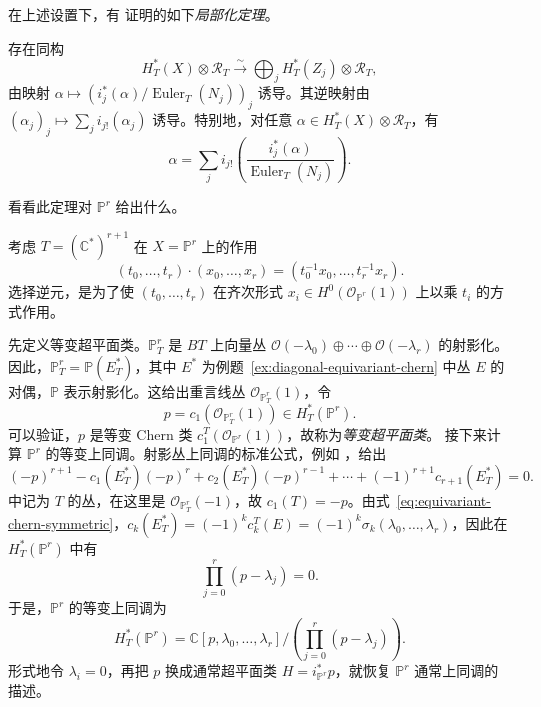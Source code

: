 在上述设置下，有  证明的如下\emph{局部化定理}。
\begin{proposition}\label{prop:atiyah-bott-localization}
存在同构
\[
H_T^*(X)\otimes\mathcal R_T\xrightarrow{\sim}\bigoplus_jH_T^*(Z_j)\otimes\mathcal R_T,
\]
由映射 $\alpha\mapsto(i_j^*(\alpha)/\operatorname{Euler}_T(N_j))_j$ 诱导。其逆映射由 $(\alpha_j)_j\mapsto\sum_ji_{j!}(\alpha_j)$ 诱导。特别地，对任意 $\alpha\in H_T^*(X)\otimes\mathcal R_T$，有
\[
\alpha=\sum_ji_{j!}\left(\frac{i_j^*(\alpha)}{\operatorname{Euler}_T(N_j)}\right).
\]
\end{proposition}
看看此定理对 $\mathbb P^r$ 给出什么。
\begin{example}\label{ex:projective-equivariant-localization}
考虑 $T=(\mathbb C^*)^{r+1}$ 在 $X=\mathbb P^r$ 上的作用
\[
(t_0,\ldots,t_r)\cdot(x_0,\ldots,x_r)=(t_0^{-1}x_0,\ldots,t_r^{-1}x_r).
\]
选择逆元，是为了使 $(t_0,\ldots,t_r)$ 在齐次形式 $x_i\in H^0(\mathcal O_{\mathbb P^r}(1))$ 上以乘 $t_i$ 的方式作用。

先定义等变超平面类。$\mathbb P_T^r$ 是 $BT$ 上向量丛 $\mathcal O(-\lambda_0)\oplus\cdots\oplus\mathcal O(-\lambda_r)$ 的射影化。因此，$\mathbb P_T^r=\mathbb P(E_T^*)$，其中 $E^*$ 为例题~\ref{ex:diagonal-equivariant-chern} 中丛 $E$ 的对偶，$\mathbb P$ 表示射影化。这给出重言线丛 $\mathcal O_{\mathbb P_T^r}(1)$，令
\[
p=c_1(\mathcal O_{\mathbb P_T^r}(1))\in H_T^*(\mathbb P^r).
\]
可以验证，$p$ 是等变 Chern 类 $c_1^T(\mathcal O_{\mathbb P^r}(1))$，故称为\emph{等变超平面类}。
接下来计算 $\mathbb P^r$ 的等变上同调。射影丛上同调的标准公式，例如 ，给出
\[
(-p)^{r+1}-c_1(E_T^*)(-p)^r+c_2(E_T^*)(-p)^{r-1}+\cdots+(-1)^{r+1}c_{r+1}(E_T^*)=0.
\]
 中记为 $T$ 的丛，在这里是 $\mathcal O_{\mathbb P_T^r}(-1)$，故 $c_1(T)=-p$。由式~\eqref{eq:equivariant-chern-symmetric}，$c_k(E_T^*)=(-1)^kc_k^T(E)=(-1)^k\sigma_k(\lambda_0,\ldots,\lambda_r)$，因此在 $H_T^*(\mathbb P^r)$ 中有
\begin{equation}\label{eq:projective-equivariant-relation}
\prod_{j=0}^r(p-\lambda_j)=0.
\end{equation}
于是，$\mathbb P^r$ 的等变上同调为
\[
H_T^*(\mathbb P^r)=\mathbb C[p,\lambda_0,\ldots,\lambda_r]\Big/\left(\prod_{j=0}^r(p-\lambda_j)\right).
\]
形式地令 $\lambda_i=0$，再把 $p$ 换成通常超平面类 $H=i_{\mathbb P^r}^*p$，就恢复 $\mathbb P^r$ 通常上同调的描述。


\end{example}
